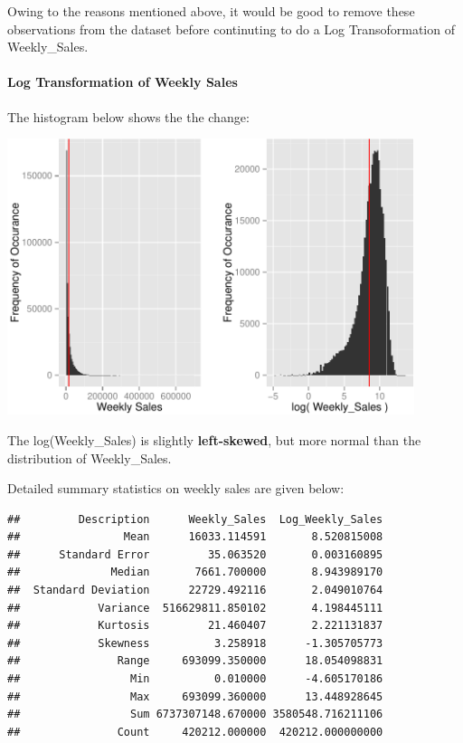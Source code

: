 \documentclass[]{article}
\begin{document}
Owing to the reasons mentioned above, it would be good to remove these
observations from the dataset before continuting to do a Log
Transoformation of Weekly\_Sales.

\paragraph{Log Transformation of Weekly
Sales}\label{log-transformation-of-weekly-sales}

The histogram below shows the the change:

\includegraphics[width=450px]{PredictingWeeklySalesAtWalmart_files/figure-latex/logWeeklySalesHistogram-1}

The log(Weekly\_Sales) is slightly \textbf{left-skewed}, but more normal
than the distribution of Weekly\_Sales.

Detailed summary statistics on weekly sales are given below:

\begin{verbatim}
##         Description      Weekly_Sales  Log_Weekly_Sales
##                Mean      16033.114591       8.520815008
##      Standard Error         35.063520       0.003160895
##              Median       7661.700000       8.943989170
##  Standard Deviation      22729.492116       2.049010764
##            Variance  516629811.850102       4.198445111
##            Kurtosis         21.460407       2.221131837
##            Skewness          3.258918      -1.305705773
##               Range     693099.350000      18.054098831
##                 Min          0.010000      -4.605170186
##                 Max     693099.360000      13.448928645
##                 Sum 6737307148.670000 3580548.716211106
##               Count     420212.000000  420212.000000000
\end{verbatim}
\end{document}
